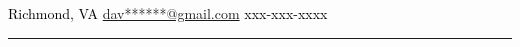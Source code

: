 \documentclass[10pt,A4]{article}
\begin{document}
\pagestyle{fancy}	

\begin{minipage}[c][0.085\textheight][t]{\linewidth}
\begin{center}
	\vspace{14pt}
	\textcolor{black}{\small{  Richmond, VA  \hspace{12pt}    \href{mailto:davidh804@gmail.com}{dav******@gmail.com}  \hspace{12pt}     xxx-xxx-xxxx}} \\ \hspace{22pt}
        \hspace{16pt}\textcolor{sectcol}{\rule[-1mm]{2pt}{0.9cm}}\hspace{12pt}


         
\end{center}
\end{minipage}\\[-4pt]

\end{document}
